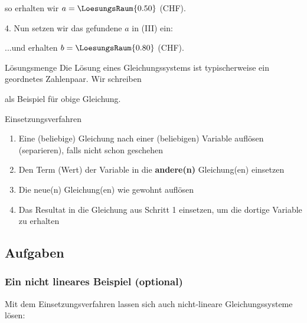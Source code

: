 so erhalten wir $a = \LoesungsRaum{0.50}$ (CHF).


4. Nun setzen wir das gefundene $a$ in (III) ein:


...und erhalten $b = \LoesungsRaum{0.80}$ (CHF).


\newpage

  \begin{gesetz}{Lösungsmenge}{}
    Die Lösung eines Gleichungssystems ist typischerweise ein
    geordnetes Zahlenpaar. Wir schreiben 


  als Beispiel für obige Gleichung.
    
    \end{gesetz}


  \begin{rezept}{Einsetzungsverfahren}{}
  \begin{enumerate}

  \item Eine (beliebige) Gleichung nach einer (beliebigen) Variable
    auf\/lösen (separieren), falls nicht schon geschehen
  \item Den Term (Wert) der Variable in die \textbf{andere(n)}
    Gleichung(en) einsetzen
  \item Die neue(n) Gleichung(en) wie gewohnt auf\/lösen
  \item Das Resultat in die Gleichung aus Schritt 1 einsetzen,
    um die dortige Variable zu erhalten
  \end{enumerate}
\end{rezept}


\subsection*{Aufgaben}
\newpage
  
\subsubsection{Ein nicht lineares Beispiel (optional)}
Mit dem Einsetzungsverfahren lassen sich auch nicht-lineare
Gleichungssysteme lösen:

